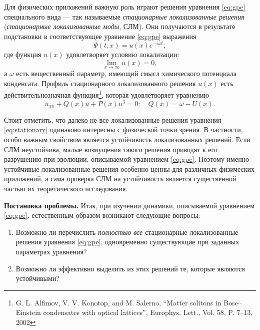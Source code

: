 \documentclass[candidate, href, colorlinks]{disser}
\begin{document}


Для физических приложений важную роль играют решения уравнения \eqref{eq:gpe} специального вида --- так называемые {\it стационарные локализованные решения} ({\it стационарные локализованные моды}, СЛМ).
Они получаются в результате подстановки в соответствующее уравнение \eqref{eq:gpe} выражения
\begin{equation}
	\Psi(t, x) = u(x) e^{-i \omega t},
\label{eq:ansatz}
\end{equation}
где функция $u(x)$ удовлетворяет условию локализации:
\begin{equation}
	\lim \limits_{x \to \infty} u(x) = 0,
\label{eq:localization}
\end{equation}
а $\omega$ есть вещественный параметр, имеющий смысл химического потенциала конденсата.
Профиль стационарного локализованного решения $u(x)$ есть действительнозначная функция\footnote{G. L. Alfimov, V. V. Konotop, and M. Salerno, ``Matter solitons in Bose--Einstein condensates with optical lattices'', Europhys. Lett., Vol. 58, P. 7--13, 2002}, которая удовлетворяет уравнению
\begin{equation}
	u_{xx} + Q(x) u + P(x) u^3 = 0; \quad Q(x) = \omega - U(x).
\label{eq:stationary}
\end{equation}

Стоит отметить, что далеко не все локализованные решения уравнения \eqref{eq:stationary} одинаково интересны с физической точки зрения.
В частности, особо важным свойством является устойчивость локализованных решений.
Если СЛМ неустойчива, малые возмущения такого решения приводят к его разрушению при эволюции, описываемой уравнением \eqref{eq:gpe}.
Поэтому именно устойчивые локализованные решения особенно ценны для различных физических приложений, а сама проверка СЛМ на устойчивость является существенной частью их теоретического исследования.

\textbf{Постановка проблемы.}
Итак, при изучении динамики, описываемой уравнением \eqref{eq:gpe}, естественным образом возникают следующие вопросы:
\begin{enumerate}
	\item Возможно ли перечислить {\it полностью все} стационарные локализованные решения уравнения \eqref{eq:gpe}, одновременно существующие при заданных параметрах уравнения?
	\item Возможно ли эффективно выделить из этих решений те, которые являются устойчивыми?
\end{enumerate}
\end{document}
